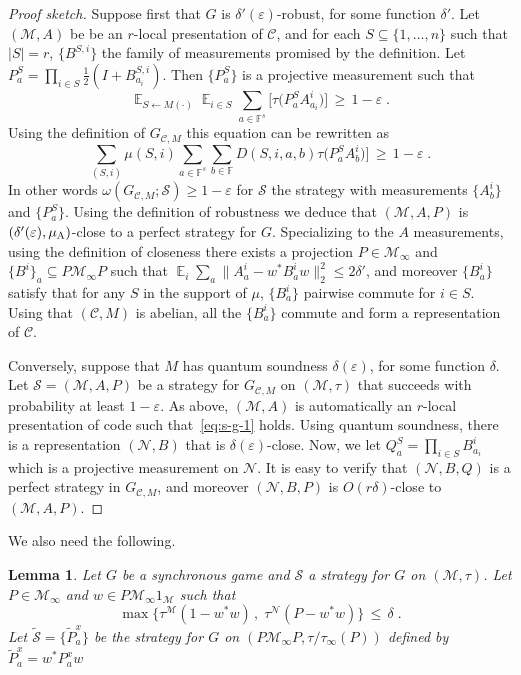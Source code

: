 \documentclass[11pt]{article}
\newtheorem{lemma}[theorem]{Lemma}
\theoremstyle{definition}
\newcommand{\code}{\mathcal{C}}
\newcommand{\strategy}{\mathscr{S}}
\newcommand{\Id}{\ensuremath{I}}
\DeclareMathOperator*{\Expectation}{\mathbb{E}}
\newcommand{\Es}[1]{\Expectation_{#1}}
\newcommand{\field}{\mathbb{F}}
\newcommand{\mM}{\ensuremath{\mathcal{M}}}
\newcommand{\eps}{\varepsilon}
\newcommand{\mN}{\mathcal{N}}
\newcommand{\labelstyle}[1]{\ensuremath{\textsc{#1}}\xspace}
\newcommand{\alice}{\labelstyle{A}}
\begin{document}
\begin{proof}[Proof sketch]
Suppose first that $G$ is $\delta'(\eps)$-robust, for some function $\delta'$. Let $(\mM,A)$ be be an $r$-local presentation of $\code$, and for each $S\subseteq\{1,\ldots,n\}$ such that $|S|=r$, $\{B^{S,i}\}$ the family of measurements promised by the definition. Let $P^S_a = \prod_{i\in S} \frac{1}{2}(\Id+B^{S,i}_{a_i})$. Then $\{P^S_a\}$ is a projective measurement such that
\begin{equation}\label{eq:s-g-1}
\Es{S\leftarrow M(\cdot)} \Es{i\in S} \sum_{a\in \field^s} \big[ \tau\big(  P^S_a  A^i_{a_i}\big) \big] \,\geq \,1-\eps\;.
\end{equation}
Using the definition of $G_{\code,M}$ this equation can be rewritten as
\[ \sum_{(S,i)} \mu(S,i) \sum_{a\in \field^s}\sum_{b\in\field} D(S,i,a,b) \tau\big(  P^S_a  A^i_{b}\big) \big] \,\geq \,1-\eps\;.\]
In other words $\omega(G_{\code,M};\strategy)\geq 1-\eps$ for $\strategy$ the strategy with measurements $\{A^i_b\}$ and $\{P^{S}_a\}$. Using the definition of robustness we deduce that $(\mM,A,P)$ is $(\delta'(\eps),\mu_\alice)$-close to a perfect strategy for $G$. Specializing to the $A$ measurements, using the definition of closeness there exists a projection $P\in \mM_\infty$ and $\{B^i\}_a \subseteq P\mM_\infty P$ such that $\Es{i}\sum_a \|A^i_a-w^* B^i_a w \|_2^2 \leq 2\delta'$, and moreover $\{B^i_a\}$ satisfy that for any $S$ in the support of $\mu$, $\{B^i_a\}$ pairwise commute for $i\in S$. Using that $(\code,M)$ is abelian, all the $\{B^i_a\}$ commute and form a representation of $\code$.

Conversely, suppose that $M$ has quantum soundness $\delta(\eps)$, for some function $\delta$.
Let $\strategy=(\mM,A,P)$ be a strategy for $G_{\code,M}$ on $(\mM,\tau)$ that succeeds with probability at least $1-\eps$. As above, $(\mM,A)$ is automatically an $r$-local presentation of code such that~\eqref{eq:s-g-1} holds. Using quantum soundness, there is a representation $(\mN,B)$ that is $\delta(\eps)$-close. Now, we let $Q^S_a = \prod_{i\in S} B^i_{a_i}$ which is a projective measurement on $\mN$. It is easy to verify that $(\mN,B,Q)$ is a perfect strategy in $G_{\code,M}$, and moreover $(\mN,B,P)$ is $O(r\delta)$-close to $(\mM,A,P)$.
\end{proof}

We also need the following. 

\begin{lemma}
Let $G$ be a synchronous game and $\strategy$ a strategy for $G$ on $(\mM,\tau)$. Let $P\in \mM_\infty$ and $w\in P\mM_\infty 1_\mM$ such that 
\[\max\big\{ \tau^\mM(1-w^*w)\,,\; \tau^\mN(P-w^*w)\big\} \,\leq\, \delta\;.\]
Let $\tilde{\strategy} = \{\tilde{P}^x_a\}$ be the strategy for $G$ on $(P\mM_\infty P, \tau/\tau_\infty(P))$ defined by $\tilde{P}^x_a=w^*P^x_a w$
\end{lemma}
\end{document}
